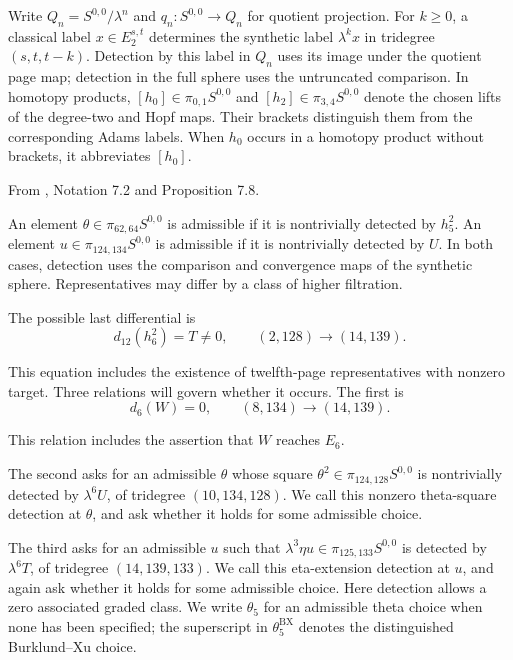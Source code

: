 Write $Q_n=S^{0,0}/\lambda^n$ and $q_n:S^{0,0}\to Q_n$ for quotient
projection. For $k\ge0$, a classical label $x\in E_2^{s,t}$ determines the synthetic
label $\lambda^kx$ in tridegree $(s,t,t-k)$. Detection by this label
in $Q_n$ uses its image under the quotient page map; detection in the
full sphere uses the untruncated comparison. In homotopy products,
$[h_0]\in\pi_{0,1}S^{0,0}$ and $[h_2]\in\pi_{3,4}S^{0,0}$ denote the
chosen lifts of the degree-two and Hopf maps. Their brackets distinguish
them from the corresponding Adams labels. When $h_0$ occurs in a
homotopy product without brackets, it abbreviates $[h_0]$.

\begin{definition}
\label{sem:Main:admissible-representatives}
From \cite{LWX126}, Notation 7.2 and Proposition 7.8.\par

An element $\theta\in\pi_{62,64}S^{0,0}$ is admissible if it is nontrivially detected by $h_5^2$. An element $u\in\pi_{124,134}S^{0,0}$ is admissible if it is nontrivially detected by $U$. In both cases, detection uses the comparison and convergence maps of the synthetic sphere. Representatives may differ by a class of higher filtration.

The possible last differential is
\[
 d_{12}(h_6^2)=T\ne0,\qquad (2,128)\longrightarrow(14,139).
\]

This equation includes the existence of twelfth-page representatives
with nonzero target. Three relations will govern whether it occurs.
The first is
\[
 d_6(W)=0,\qquad (8,134)\longrightarrow(14,139).
\]

This relation includes the assertion that $W$ reaches $E_6$.

The second asks for an admissible $\theta$ whose square
$\theta^2\in\pi_{124,128}S^{0,0}$ is nontrivially detected by
$\lambda^6U$, of tridegree $(10,134,128)$. We call this nonzero
theta-square detection at $\theta$, and ask whether it holds for some
admissible choice.

The third asks for an admissible $u$ such that
$\lambda^3\eta u\in\pi_{125,133}S^{0,0}$ is detected by
$\lambda^6T$, of tridegree $(14,139,133)$. We call this eta-extension
detection at $u$, and again ask whether it holds for some admissible
choice. Here detection allows a zero associated graded class.
We write $\theta_5$ for an admissible theta choice when none has been
specified; the superscript in $\theta_5^{\mathrm{BX}}$ denotes
the distinguished Burklund--Xu choice.
\end{definition}

